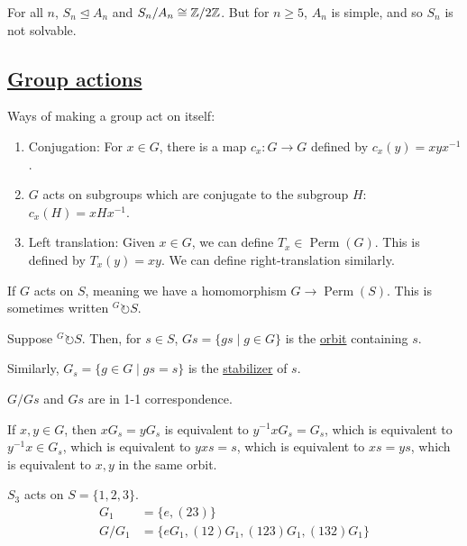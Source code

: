 \documentclass[x11names,reqno,14pt]{extarticle}
\DeclareMathOperator{\Perm}{Perm}
\begin{document}
For all $n$, $S_n\unlhd A_n$ and $S_n/A_n \cong \mathbb{Z}/2\mathbb{Z}$. But for $n \geq 5$, $A_n$ is simple, and so $S_n$ is not solvable. 

\subsection*{\underline{Group actions}}

Ways of making a group act on itself:
\begin{enumerate}
\item Conjugation: For $x \in G$, there is a map $c_x:G\to G$ defined by $c_x(y) = xyx^{-1}$. 
\item $G$ acts on subgroups which are conjugate to the subgroup $H$: $c_x(H) = xHx^{-1}$. 
\item Left translation: Given $x \in G$, we can define $T_x\in \Perm(G)$. This is defined by $T_x(y) = xy$. We can define right-translation similarly. 
\end{enumerate}

If $G$ acts on $S$, meaning we have a homomorphism $G\to\Perm(S)$. This is sometimes written ${}^G\circlearrowright S$. 


Suppose ${}^G\circlearrowright S$. Then, for $s \in S$, $Gs = \{gs \mid g \in G\}$ is the \underline{orbit} containing $s$. 

Similarly, $G_s = \{g \in G \mid gs = s\}$ is the \underline{stabilizer} of $s$. 

\claim 

$G/Gs$ and $Gs$ are in 1-1 correspondence. 

\proof

If $x, y \in G$, then $xG_s = yG_s$ is equivalent to $y^{-1}x G_s = G_s$, which is equivalent to $y^{-1}x \in G_s$, which is equivalent to $yxs = s$, which is equivalent to $xs = ys$, which is equivalent to $x, y$ in the same orbit. 

\exm

$S_3$ acts on $S = \{1, 2, 3\}$. 
\begin{align*}
G_1 & = \{e, (23)\} \\
G/G_1 & = \{eG_1, (12)G_1, (123)G_1, (132)G_1\} \\
\end{align*}
\end{document}
